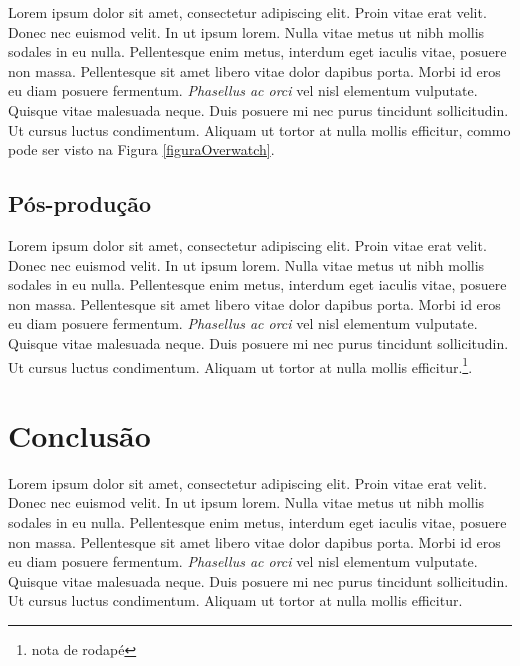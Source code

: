 \documentclass[10pt, conference, compsocconf]{IEEEtran}
\begin{document}
Lorem ipsum dolor sit amet, consectetur adipiscing elit. Proin vitae erat velit. Donec nec euismod velit. In ut ipsum lorem. Nulla vitae metus ut nibh mollis sodales in eu nulla. Pellentesque enim metus, interdum eget iaculis vitae, posuere non massa. Pellentesque sit amet libero vitae dolor dapibus porta. Morbi id eros eu diam posuere fermentum. \textit{Phasellus ac orci} vel nisl elementum vulputate. Quisque vitae malesuada neque. Duis posuere mi nec purus tincidunt sollicitudin. Ut cursus luctus condimentum. Aliquam ut tortor at nulla mollis efficitur, commo pode ser visto na Figura \ref{figuraOverwatch}.

\subsection{Pós-produção}
Lorem ipsum dolor sit amet, consectetur adipiscing elit. Proin vitae erat velit. Donec nec euismod velit. In ut ipsum lorem. Nulla vitae metus ut nibh mollis sodales in eu nulla. Pellentesque enim metus, interdum eget iaculis vitae, posuere non massa. Pellentesque sit amet libero vitae dolor dapibus porta. Morbi id eros eu diam posuere fermentum. \textit{Phasellus ac orci} vel nisl elementum vulputate. Quisque vitae malesuada neque. Duis posuere mi nec purus tincidunt sollicitudin. Ut cursus luctus condimentum. Aliquam ut tortor at nulla mollis efficitur.\footnote{nota de rodapé}.

\section{Conclusão}

Lorem ipsum dolor sit amet, consectetur adipiscing elit. Proin vitae erat velit. Donec nec euismod velit. In ut ipsum lorem. Nulla vitae metus ut nibh mollis sodales in eu nulla. Pellentesque enim metus, interdum eget iaculis vitae, posuere non massa. Pellentesque sit amet libero vitae dolor dapibus porta. Morbi id eros eu diam posuere fermentum. \textit{Phasellus ac orci} vel nisl elementum vulputate. Quisque vitae malesuada neque. Duis posuere mi nec purus tincidunt sollicitudin. Ut cursus luctus condimentum. Aliquam ut tortor at nulla mollis efficitur.

\printbibliography
\end{document}
